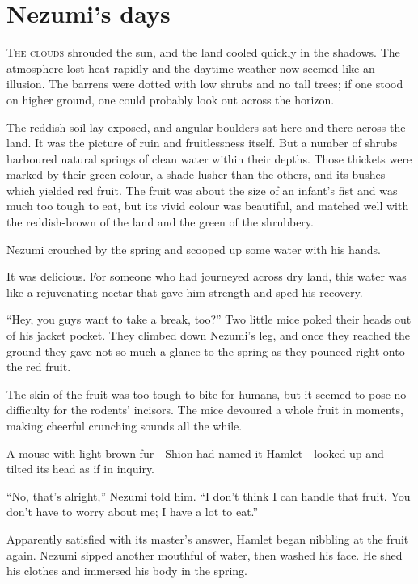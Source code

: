 
\chapter{Nezumi's days}

\lettrine{T}{he clouds} shrouded the sun, and the land cooled quickly in the shadows.
The atmosphere lost heat rapidly and the daytime weather now seemed like
an illusion. The barrens were dotted with low shrubs and no tall trees;
if one stood on higher ground, one could probably look out across the
horizon.

The reddish soil lay exposed, and angular boulders sat here and there
across the land. It was the picture of ruin and fruitlessness itself.
But a number of shrubs harboured natural springs of clean water within
their depths. Those thickets were marked by their green colour, a shade
lusher than the others, and its bushes which yielded red fruit. The
fruit was about the size of an infant's fist and was much too tough to
eat, but its vivid colour was beautiful, and matched well with the
reddish-brown of the land and the green of the shrubbery.

Nezumi crouched by the spring and scooped up some water with his hands.

It was delicious. For someone who had journeyed across dry land, this
water was like a rejuvenating nectar that gave him strength and sped his
recovery.

``Hey, you guys want to take a break, too?'' Two little mice poked their
heads out of his jacket pocket. They climbed down Nezumi's leg, and once
they reached the ground they gave not so much a glance to the spring as
they pounced right onto the red fruit.

The skin of the fruit was too tough to bite for humans, but it seemed to
pose no difficulty for the rodents' incisors. The mice devoured a whole
fruit in moments, making cheerful crunching sounds all the while.

A mouse with light-brown fur---Shion had named it
Hamlet---looked up and tilted its head as if in inquiry.

``No, that's alright,'' Nezumi told him. ``I don't think I can handle
that fruit. You don't have to worry about me; I have a lot to eat.''

Apparently satisfied with its master's answer, Hamlet began nibbling at
the fruit again. Nezumi sipped another mouthful of water, then washed
his face. He shed his clothes and immersed his body in the spring.

